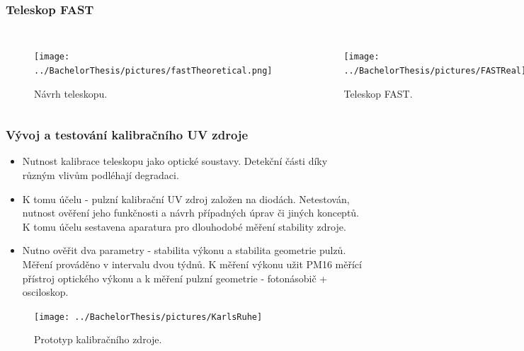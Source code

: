 \documentclass{beamer}
\begin{document}
\begin{frame}
\frametitle{Teleskop FAST}
\begin{columns}[t]
\centering
\begin{figure}[H]
\texttt{[image: ../BachelorThesis/pictures/fastTheoretical.png]}\\
\caption{Návrh teleskopu.}
\end{figure}
\centering
\begin{figure}[H]
\texttt{[image: ../BachelorThesis/pictures/FASTReal]}\\
\caption{Teleskop FAST.}
\end{figure}
\end{columns}



\end{frame}



\begin{frame}
\frametitle{Vývoj a testování kalibračního UV zdroje}
\begin{itemize}
 \item Nutnost kalibrace teleskopu jako optické soustavy. Detekční části díky různým vlivům podléhají degradaci.
 \item K tomu účelu - pulzní kalibrační UV zdroj založen na diodách. Netestován, nutnost ověření jeho funkčnosti a návrh případných úprav či jiných konceptů. K tomu účelu sestavena aparatura pro dlouhodobé měření stability zdroje.
 \item Nutno ověřit dva parametry - stabilita výkonu a stabilita geometrie pulzů. Měření prováděno v intervalu dvou týdnů. K měření výkonu užit PM16 měřící přístroj optického výkonu a k měření pulzní geometrie - fotonásobič + osciloskop.
\end{itemize}





\end{frame}

\begin{frame}


 \begin{figure}[H]
 \centering
 \texttt{[image: ../BachelorThesis/pictures/KarlsRuhe]}
 \caption{Prototyp kalibračního zdroje.}
 \label{UVsource}
\end{figure}


\end{frame}
\end{document}

